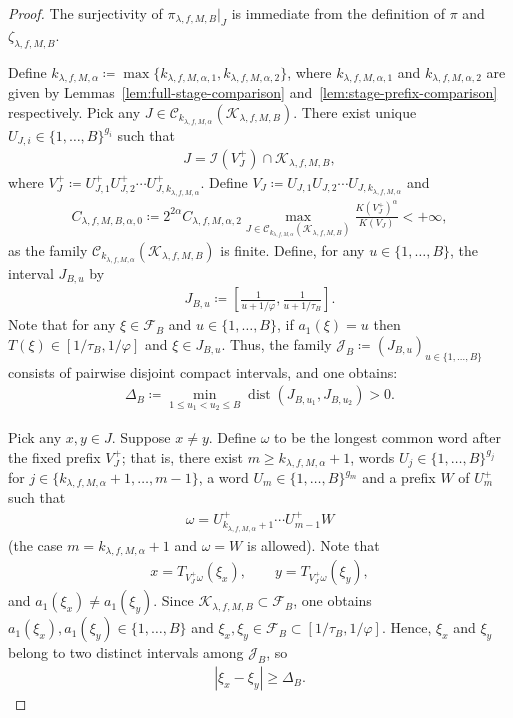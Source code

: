 \documentclass[10pt,a4paper]{amsart}
\begin{document}
\begin{proof}
The surjectivity of $\pi_{\lambda,f,M,B}|_J$ is immediate from the definition of $\pi$ and $\zeta_{\lambda,f,M,B}$.

Define $k_{\lambda,f,M,\alpha}\coloneqq \max{\{k_{\lambda,f,M,\alpha,1},k_{\lambda,f,M,\alpha,2}\}}$, where $k_{\lambda,f,M,\alpha,1}$ and $k_{\lambda,f,M,\alpha,2}$ are given by Lemmas~\ref{lem:full-stage-comparison} and~\ref{lem:stage-prefix-comparison} respectively.
Pick any $J\in\mathscr{C}_{k_{\lambda,f,M,\alpha}}(\mathcal{K}_{\lambda,f,M,B})$. There exist unique $U_{J,i}\in\{1,\ldots,B\}^{g_i}$ such that 
\begin{align*}
    J=\mathcal{I}(V^+_J)\cap\mathcal{K}_{\lambda,f,M,B},
\end{align*}
where $V^+_J\coloneqq U_{J,1}^+U_{J,2}^+\cdots U_{J,k_{\lambda,f,M,\alpha}}^+$. Define $V_J\coloneqq U_{J,1}U_{J,2}\cdots U_{J,k_{\lambda,f,M,\alpha}}$ and
\begin{align*}
    C_{\lambda,f,M,B,\alpha,0}
    \coloneqq 2^{2\alpha}C_{\lambda,f,M,\alpha,2}
    \max_{J\in\mathscr{C}_{k_{\lambda,f,M,\alpha}}(\mathcal{K}_{\lambda,f,M,B})}{\frac{K(V^+_J)^\alpha}{K(V_J)}}<+\infty,
\end{align*}
as the family $\mathscr{C}_{k_{\lambda,f,M,\alpha}}(\mathcal{K}_{\lambda,f,M,B})$ is finite. Define, for any $u\in\{1,\dots,B\}$, the interval $J_{B,u}$ by
\begin{align*}
    J_{B,u}\coloneqq
    \left[
    \frac{1}{u+1/\varphi},
    \frac{1}{u+1/\tau_B}
    \right].
\end{align*}
Note that for any $\xi\in\mathcal{F}_B$ and $u\in\{1,\ldots,B\}$, if $a_1(\xi)=u$ then $T(\xi)\in[1/\tau_B,1/\varphi]$ and $\xi\in J_{B,u}$. Thus, the family $\mathscr{J}_B\coloneqq(J_{B,u})_{u\in\{1,\ldots,B\}}$ consists of pairwise disjoint compact intervals, and one obtains:
\begin{align*}
    \Delta_B
    \coloneqq
    \min_{1\leq u_1<u_2\leq B}\operatorname{dist}{\left(J_{B,u_1},J_{B,u_2}\right)}>0.
\end{align*}

Pick any $x,y\in J$. Suppose $x\ne y$. Define $\omega$ to be the longest common word after the fixed prefix $V^+_J$; that is, there exist $m\geq k_{\lambda,f,M,\alpha}+1$, words $U_j\in\{1,\ldots,B\}^{g_j}$ for $j\in\{k_{\lambda,f,M,\alpha}+1,\ldots,m-1\}$, a word $U_m\in\{1,\ldots,B\}^{g_m}$ and a prefix $W$ of $U_m^+$ such that
\begin{align*}
    \omega=U^+_{k_{\lambda,f,M,\alpha}+1}\cdots U^+_{m-1}W
\end{align*}
(the case $m=k_{\lambda,f,M,\alpha}+1$ and $\omega=W$ is allowed). Note that
\begin{align*}
    x=T_{V^+_J\omega}(\xi_x), \qquad
    y=T_{V^+_J\omega}(\xi_y),
\end{align*}
and $a_1(\xi_x)\ne a_1(\xi_y)$. Since $\mathcal{K}_{\lambda,f,M,B}\subset\mathcal{F}_B$, one obtains $a_1(\xi_x),a_1(\xi_y)\in\{1,\dots,B\}$ and $\xi_x,\xi_y\in\mathcal{F}_B\subset[1/\tau_B,1/\varphi]$. Hence, $\xi_x$ and $\xi_y$ belong to two distinct intervals among $\mathscr{J}_B$, so
\begin{align*}
    |\xi_x-\xi_y|\geq \Delta_B.
\end{align*}


\end{proof}
\end{document}
